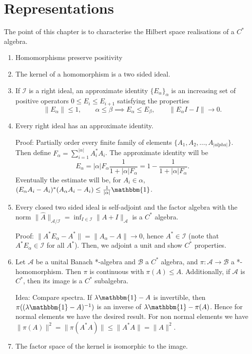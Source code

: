 \documentclass[twoside,symmetric, openany, 12pt]{./tuftebook}
\theoremstyle{definition}
\theoremstyle{definition}
\theoremstyle{definition}
\begin{document}
\section{Representations}
The point of this chapter is to characterise the Hilbert space realisations of a $C^*$ algebra.
\begin{enumerate}
	\item Homomorphisms preserve positivity
	\item The kernel of a homomorphism is a two sided ideal.
	\item If $\mathcal{I}$ is a right ideal, an approximate identity $\{E_\alpha\}_\alpha$ is an increasing set of positive operators $0\le E_i \le E_{i+1}$ satisfying the properties
		\[
		\|E_\alpha\|\le 1,\qquad \alpha\le \beta \implies E_\alpha \le E_\beta,\qquad \|E_\alpha I - I \|\to 0
		.\] 
	\item Every right ideal has an approximate identity.

		Proof: Partially order every finite family of elements $\{A_1,A_2,\dots, A_{|alpha|}\} $. Then define $F_\alpha = \sum_{i=1}^{|\alpha|} A_i^*A_i$. The approximate identity will be
		\[
		E_\alpha = |\alpha|F_\alpha \frac{1}{1+|\alpha|F_\alpha}=1-\frac{1}{1+|\alpha|F_\alpha}
		.\] 
		Eventually the estimate will be, for $A_i\in\alpha$, $(E_\alpha A_i-A_i)^* (A_\alpha A_i - A_i)\le \frac{1}{|\alpha|}\mathbbm{1}$.
	\item Every closed two sided ideal is self-adjoint and the factor algebra with the norm $\|\hat{A}\|_{\mathcal{A} / \mathcal{I}}=\inf_{I\in \mathcal{I}}\|A+I\|_{\mathcal{A}}$ is a $C^*$ algebra. 

		Proof: $\|A^* E_\alpha - A^*\|=\|A_\alpha - A\|\to 0$, hence $A^*\in \mathcal{I}$ (note that $A^*E_\alpha\in \mathcal{I}$ for all $A^*$). Then, we adjoint a unit and show $C^*$ properties.
	\item Let $\mathcal{A}$ be a unital Banach *-algebra and $\mathcal{B}$ a $C^*$ algebra, and $\pi:\mathcal{A}\to \mathcal{B}$ a *-homomorphism. Then $\pi$ is continuous with $\pi(A)\le A$. Additionally, if $\mathcal{A}$ is $C^*$, then its image is a $C^*$ subalgebra.

		Idea: Compare spectra. If $\lambda\mathbbm{1}-A$ is invertible, then $\pi((\lambda\mathbbm{1}-A)^{-1})$ is an inverse of $\lambda\mathbbm{1}-\pi(A) $. Hence for normal elements we have the desired result. For non normal elements we have $\|\pi(A)\|^2 = \|\pi(A^*A)\|\le \|A^*A\|=\|A\|^2$.
	\item The factor space of the kernel is isomorphic to the image.


\end{enumerate}
\end{document}
